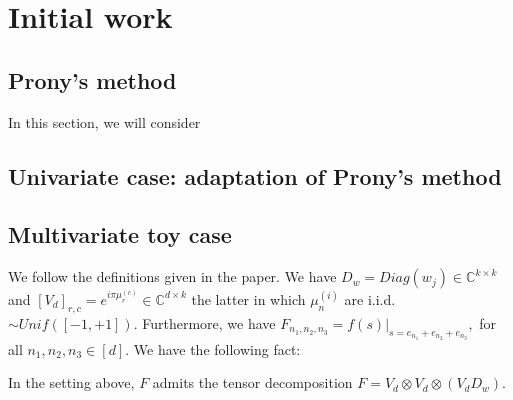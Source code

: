 \chapter{Initial work}
\section{Prony's method}
In this section, we will consider 
\section{Univariate case: adaptation of Prony's method}
\section{Multivariate toy case}
We follow the definitions given in the paper. We have $D_w=Diag(w_j)\in\mathbb{C}^{k\times k}$ and $[V_d]_{r,c}=e^{i\pi\mu_r^{(c)}}\in\mathbb{C}^{d\times k}$ the latter in which $\mu_n^{(i)}$ are i.i.d. $\sim Unif([-1,+1])$. Furthermore, we have $F_{n_1,n_2,n_3}=f(s)\big|_{s=e_{n_1}+e_{n_2}+e_{n_3}},$ for all $n_1,n_2,n_3\in[d]$. We have the following fact:
\begin{fact}
    In the setting above, $F$ admits the tensor decomposition $F=V_d\otimes V_d\otimes(V_dD_w)$.
\end{fact}
